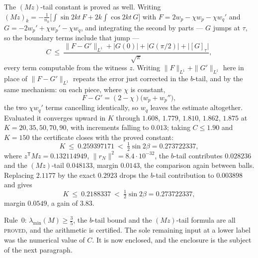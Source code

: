 \documentclass[11pt]{article}
\theoremstyle{definition}
\begin{document}
The $(Mz)$-tail constant is proved as well. Writing
$(Mz)_k=-\tfrac1{n_k}\bigl[\int\sin 2kt\,F+2k\int\cos 2kt\,G\bigr]$ with
$F=2w_p-\chi w_p-\chi w_q'$ and $G=-2w_p'+\chi w_p'-\chi w_q$, and integrating the second
by parts --- $G$ jumps at $\tau$, so the boundary terms include that jump ---
\[
  C\ \le\ \frac{\|F-G'\|_{L^1}+|G(0)|+|G(\pi/2)|+\bigl|[G]_\tau\bigr|}{\sqrt\pi} ,
\]
every term computable from the witness $z$. Writing $\|F\|_{L^1}+\|G'\|_{L^1}$ here in
place of $\|F-G'\|_{L^1}$ repeats the error just corrected in the $b$-tail, and by the same
mechanism: on each piece, where $\chi$ is constant,
\[
  F-G'=(2-\chi)\bigl(w_p+w_p''\bigr) ,
\]
the two $\chi w_q'$ terms cancelling identically, so $w_q$ leaves the estimate altogether. Evaluated it converges upward in $K$ through
$1.608$, $1.779$, $1.810$, $1.862$, $1.875$ at $K=20,35,50,70,90$, with increments falling
to $0.013$; taking $C\le1.90$ and $K=150$ the certificate closes with the proved constant:
\[
  K\ \le\ 0.259397171\ <\ \tfrac12\sin2\beta = 0.273722337 ,
\]
where $z^{\mathsf T}Mz=0.132114949$, $\|r_N\|^2=8.4\cdot10^{-32}$, the $b$-tail contributes
$0.028236$ and the $(Mz)$-tail $0.048133$, margin $0.0143$, the comparison again between
balls. Replacing $2.1177$ by the exact $0.2923$ drops the $b$-tail contribution to
$0.003898$ and gives
\[
  K\ \le\ 0.2188337\ <\ \tfrac12\sin2\beta=0.273722337 ,
\]
margin $0.0549$, a gain of $3.83$.

Rule~0: $\lambda_{\min}(M)\ge\tfrac35$, the $b$-tail bound and the $(Mz)$-tail formula are
all \textsc{proved}, and the arithmetic is certified. The sole remaining input at a lower
label was the numerical value of $C$. It is now enclosed, and the enclosure is the
subject of the next paragraph.
\end{document}
